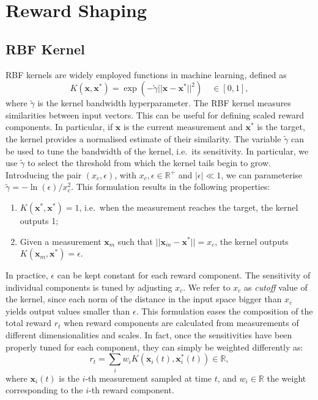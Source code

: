 \newpage
\section{Reward Shaping}
\label{sec:reward_shaping}

\subsection{RBF Kernel}

\ac{RBF} kernels are widely employed functions in machine learning, defined as
$$
K(\mathbf{x}, \mathbf{x}^*) = \exp \left( -\tilde\gamma ||\mathbf{x} - \mathbf{x}^*||^2  \right) \quad \in [0, 1] ,
$$
where $\tilde\gamma$ is the kernel bandwidth hyperparameter.
The \ac{RBF} kernel measures similarities between input vectors.
This can be useful for defining scaled reward components.
In particular, if $\mathbf{x}$ is the current measurement and $\mathbf{x}^*$ is the target, the kernel provides a normalised estimate of their similarity.
The variable $\tilde\gamma$ can be used to tune the bandwidth of the kernel, i.e.\ its sensitivity.
In particular, we use $\tilde\gamma$ to select the threshold from which the kernel tails begin to grow.
Introducing the pair $(x_c, \epsilon)$, with $x_c, \epsilon \in \mathbb{R}^+$ and $|\epsilon| \ll 1$, we can parameterise $\tilde\gamma = -\ln(\epsilon) / x_c^2$.
This formulation results in the following properties:

\begin{enumerate}
    \item $K(\mathbf{x}^*, \mathbf{x}^*) = 1$, i.e.\ when the measurement reaches the target, the kernel outputs 1;
    \item Given a measurement $\mathbf{x}_m$ such that $||\mathbf{x}_m - \mathbf{x}^*|| = x_c$, the kernel outputs $K(\mathbf{x}_m, \mathbf{x}^*) = \epsilon$.
\end{enumerate}

\noindent
In practice, $\epsilon$ can be kept constant for each reward component.
The sensitivity of individual components is tuned by adjusting $x_c$.
We refer to $x_c$ as \emph{cutoff} value of the kernel, since each norm of the distance in the input space bigger than $x_c$ yields output values smaller than $\epsilon$.
This formulation eases the composition of the total reward $r_t$ when reward components are calculated from measurements of different dimensionalities and scales.
In fact, once the sensitivities have been properly tuned for each component, they can simply be weighted differently as:
%
\begin{equation}
    \label{eq:weighted_reward_kernel}
    r_t = \sum_i w_i K \left( \mathbf{x}_i(t), \mathbf{x}_i^*(t) \right) \in \mathbb{R}
    ,
\end{equation}
%
where $\mathbf{x}_{i}(t)$ is the $i$-th measurement sampled at time $t$, and $w_i \in \mathbb{R}$ the weight corresponding to the $i$-th reward component.


